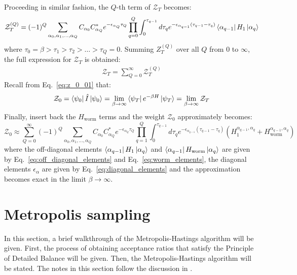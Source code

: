 \documentclass[12pt, two sided]{article}
\begin{document}
Proceeding in similar fashion, the $Q$-th term of $\mathcal{Z}_T$ becomes:
\begin{equation}
\label{eq:Z^q}
\mathcal{Z}_T^{(Q)} = (-1)^{Q}  \sum_{\alpha_0,\alpha_1,\dots,\alpha_Q} C_{\alpha_0} C_{\alpha_Q}^* e^{-\epsilon_{\alpha_Q} \tau_Q} \prod_{q=0}^Q \int_0^{\tau_{q-1}} d\tau_q e^{-\epsilon_{\alpha_{q-1}}(\tau_{q-1}-\tau_q)} 
\bra{\alpha_{q-1}} H_1 \ket{\alpha_q}
\end{equation}
where $\tau_0 = \beta > \tau_1 > \tau_2 > \dots > \tau_Q = 0$. Summing $Z_T^{(Q)}$ over all $Q$ from $0$ to $\infty$, the full expression for $\mathcal{Z}_T$ is obtained:
%
\begin{equation}
\begin{aligned}
\mathcal{Z}_T = \sum_{Q=0}^{\infty} \mathcal{Z}_T^{(Q)}
\end{aligned}
\end{equation}
%
Recall from Eq.~\eqref{eq:z_0_01} that:
%
\begin{equation}
\mathcal{Z}_0 = \bra{\psi_0} \hat{I} \ket{\psi_0} = \lim_{\beta\to\infty} \bra{\psi_T} e^{-\beta H} \ket{\psi_T} = \lim_{\beta\to\infty} \mathcal{Z}_T
\end{equation}
%
Finally, insert back the $H_\mathrm{worm}$ terms and the weight $\mathcal{Z}_0$ approximately becomes:
\begin{equation}
\label{eq:Z_0}
\mathcal{Z}_0 \approx 
\sum_{Q=0}^{\infty} (-1)^{Q}  \sum_{\alpha_0,\alpha_1,\dots,\alpha_Q} C_{\alpha_0} C_{\alpha_Q}^* e^{-\epsilon_{\alpha_Q} \tau_Q} \prod_{q=1}^Q \int_0^{\tau_{q-1}} d\tau_q e^{-\epsilon_{\alpha_{q-1}}(\tau_{q-1}-\tau_q)} 
(H_1^{\alpha_{q-1},\alpha_q} + H_\mathrm{worm}^{\alpha_{q-1},\alpha_q})
\end{equation}
where the off-diagonal elements $\bra{\alpha_{q-1}} H_1 \ket{\alpha_q}$ and $\bra{\alpha_{q-1}} H_\mathrm{worm} \ket{\alpha_q}$ are given by Eq.~\eqref{eq:off_diagonal_elements} and Eq.~\eqref{eq:worm_elements}, the diagonal elements $\epsilon_{\alpha}$ are given by Eq.~\eqref{eq:diagonal_elements} and the approximation becomes exact in the limit $\beta\to\infty$.


\section{Metropolis sampling}

In this section, a brief walkthrough of the Metropolis-Hastings algorithm \cite{doi:10.1063/1.1699114} will be given. First, the process of obtaining acceptance ratios that satisfy the Principle of Detailed Balance will be given. Then, the Metropolis-Hastings algorithm will be stated. The notes in this section follow the discussion in \cite{bkeng.metropolis}.
\end{document}
